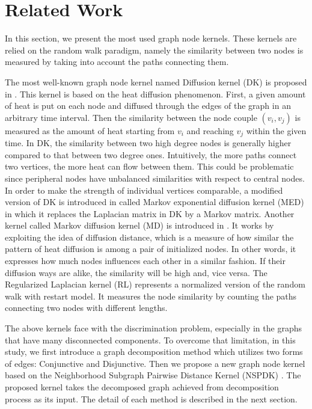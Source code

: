 \documentclass{esannV2}
\begin{document}
\section{Related Work} \label{related_work}
In this section, we present the most used graph node kernels. These kernels are relied on the random walk paradigm, namely the similarity between two nodes is measured by taking into account the paths connecting them.

The most well-known graph node kernel named Diffusion kernel (DK) is proposed in \cite{ledk}. This kernel is based on the heat diffusion phenomenon. First, a given amount of heat is put on each node and diffused through the edges of the graph in an arbitrary time interval. Then the similarity between the node couple $(v_{i}, v_{j})$ is measured as the amount of heat starting from $v_{i}$ and reaching $v_{j}$ within the given time. In DK, the similarity between two high degree nodes is generally higher compared to that between two degree ones. Intuitively, the more paths connect two vertices, the more heat can flow between them. This could be problematic since peripheral nodes have unbalanced similarities with respect to central nodes. In order to make the strength of individual vertices comparable, a modified version of DK is introduced in \cite{medk} called Markov exponential diffusion kernel (MED) in which it replaces the Laplacian matrix in DK by a Markov matrix.  Another kernel called Markov diffusion kernel (MD) is introduced in \cite{mdk}. It works by exploiting the idea of diffusion distance, which is a measure of how similar the pattern of heat diffusion is among a pair of initialized nodes. In other words, it expresses how much nodes influences each other in a similar fashion. If their diffusion ways are alike, the similarity will be high and, vice versa. The Regularized Laplacian kernel (RL) \cite{rlk} represents a normalized version of the random walk with restart model. It measures the node similarity by counting the paths connecting two nodes with different lengths.

The above kernels face with the discrimination problem, especially in the graphs that have many disconnected components. To overcome that limitation, in this study, we first introduce a graph decomposition method which utilizes two forms of edges: Conjunctive and Disjunctive. Then we propose a new graph node kernel based on the Neighborhood Subgraph Pairwise Distance Kernel (NSPDK) \cite{nspdk}. The proposed kernel takes the decomposed graph achieved from decomposition process as its input. The detail of each method is described in the next section.
\end{document}
